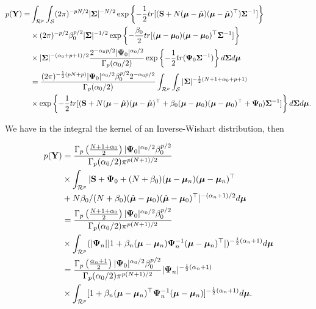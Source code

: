 \begin{enumerate}[leftmargin=*]
\begin{align*}
	p({\bf{Y}})=&\int_{\mathcal{R}^p}\int_{\mathcal{S}}(2\pi)^{-pN/2}|\mathbf{\Sigma}|^{-N/2}\exp\left\{-\frac{1}{2}tr[({\bf{S}}+N(\bm{\mu}-\hat{\bm{\mu}})(\bm{\mu}-\hat{\bm{\mu}})^{\top})\mathbf{\Sigma}^{-1}]\right\}\\
	&\times (2\pi)^{-p/2}\beta_0^{p/2}|\mathbf{\Sigma}|^{-1/2}\exp\left\{-\frac{\beta_0}{2}tr[(\bm{\mu}-\bm{\mu}_0)(\bm{\mu}-\bm{\mu}_0)^{\top}\mathbf{\Sigma}^{-1}]\right\}\\
	&\times |\mathbf{\Sigma}|^{-(\alpha_0+p+1)/2}\frac{2^{-\alpha_0p/2}|\mathbf{\Psi}_0|^{\alpha_0/2}}{\Gamma_p(\alpha_0/2)}\exp\left\{-\frac{1}{2}tr(\mathbf{\Psi}_0\mathbf{\Sigma}^{-1})\right\}d\mathbf{\Sigma} d\bm{\mu}\\
	&=\frac{(2\pi)^{-\frac{1}{2}(pN+p)}|\mathbf{\Psi}_0|^{\alpha_0/2}\beta_0^{p/2}2^{-\alpha_0p/2}}{\Gamma_p(\alpha_0/2)}\int_{\mathcal{R}^p}\int_{\mathcal{S}} |\mathbf{\Sigma}|^{-\frac{1}{2}(N+1+\alpha_0+p+1)}\\
	&\times \exp\left\{-\frac{1}{2}tr[({\bf{S}}+N(\bm{\mu}-\hat{\bm{\mu}})(\bm{\mu}-\hat{\bm{\mu}})^{\top}+\beta_0(\bm{\mu}-\bm{\mu}_0)(\bm{\mu}-\bm{\mu}_0)^{\top}+\mathbf{\Psi}_0)\mathbf{\Sigma}^{-1}]\right\}d\mathbf{\Sigma} d\bm{\mu}.
\end{align*}

We have in the integral the kernel of an Inverse-Wishart distribution, then

\begin{align*}
p({\bf{Y}})	&=\frac{\Gamma_p\left(\frac{N+1+\alpha_0}{2}\right)|\mathbf{\Psi}_0|^{\alpha_0/2}\beta_0^{p/2}}{\Gamma_p(\alpha_0/2)\pi^{p(N+1)/2}}\\
	&\times\int_{\mathcal{R}^p} |{\bf{S}}+\mathbf{\Psi}_0+(N+\beta_0)(\bm{\mu}-\bm{\mu}_n)(\bm{\mu}-\bm{\mu}_n)^{\top}\\
	&+N\beta_0/(N+\beta_0)(\hat{\bm{\mu}}-\bm{\mu}_0)(\hat{\bm{\mu}}-\bm{\mu}_0)^{\top}|^{-(\alpha_n+1)/2} d\bm{\mu}\\
	&=\frac{\Gamma_p\left(\frac{N+1+\alpha_0}{2}\right)|\mathbf{\Psi}_0|^{\alpha_0/2}\beta_0^{p/2}}{\Gamma_p(\alpha_0/2)\pi^{p(N+1)/2}}\\
	&\times\int_{\mathcal{R}^p} (|\mathbf{\Psi}_n||1+\beta_n(\bm{\mu}-\bm{\mu}_n)\mathbf{\Psi}_n^{-1}(\bm{\mu}-\bm{\mu}_n)^{\top}|)^{-\frac{1}{2}(\alpha_n+1)} d\bm{\mu}\\
	&=\frac{\Gamma_p\left(\frac{\alpha_n+1}{2}\right)|\mathbf{\Psi}_0|^{\alpha_0/2}\beta_0^{p/2}}{\Gamma_p(\alpha_0/2)\pi^{p(N+1)/2}}|\mathbf{\Psi}_n|^{-\frac{1}{2}(\alpha_n+1)}\\
	&\times\int_{\mathcal{R}^p} [1+\beta_n(\bm{\mu}-\bm{\mu}_n)^{\top}\mathbf{\Psi}_n^{-1}(\bm{\mu}-\bm{\mu}_n)]^{-\frac{1}{2}(\alpha_n+1)} d\bm{\mu}.
\end{align*} 


\end{enumerate}
